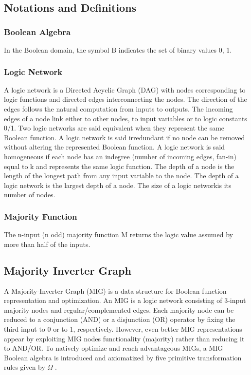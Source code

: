 \documentclass[
	accentcolor=1c,%
	type=intern,
	marginpar=false,
	ruledheaders=section,
	class=report,
	BCOR=5mm,
      parskip=half-,
	fontsize=10pt
	]{tudapub}
\begin{document}
	\subsection{Notations and Definitions}

	\subsubsection{Boolean Algebra}
	In the Boolean domain, the symbol B indicates the set of binary values {0, 1}.
	\newline
	\subsubsection{Logic Network}
	A logic network is a Directed Acyclic Graph (DAG) with nodes corresponding to logic functions
	and directed edges interconnecting the nodes. The direction of the edges follows the natural
	computation from inputs to outputs. The incoming edges of a node link either to other nodes,
	to input variables or to logic constants 0/1. Two logic networks are said equivalent when they
	represent the same Boolean function. A logic network is said irredundant if no node can be
	removed without altering the represented Boolean function. A logic network is said homogeneous
	if each node has an indegree (number of incoming edges, fan-in) equal to k and represents the
	same logic function. The depth of a node is the length of the longest path from any input
	variable to the node. The depth of a logic network is the largest depth of a node.
	The size of a logic networkis its number of nodes.
	\newline

	\subsubsection{Majority Function}
	The n-input (n odd) majority function M returns the logic value assumed by more than half
	of the inputs.
	\newline
	\subsection{Majority Inverter Graph}

	A Majority-Inverter Graph (MIG) is a data structure for Boolean function representation and
	optimization. An MIG is a logic network consisting of 3-input majority nodes and regular/complemented edges. Each majority node can be reduced to a conjunction (AND) or a disjunction (OR) operator by fixing the third input to 0 or to 1, respectively. However, even better MIG representations appear by exploiting MIG nodes functionality (majority) rather than reducing it to AND/OR. To natively optimize and reach advantageous MIGs, a MIG Boolean algebra is introduced and axiomatized by five primitive transformation rules given by $\Omega$ .\newline
\end{document}

